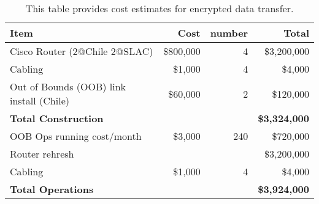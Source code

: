 \tiny \begin{longtable} {|l|r|r|r|} \caption{This table provides cost estimates for encrypted data transfer. \label{tab:ipsec}}\\ 
\hline 
\textbf{Item}&\textbf{Cost}&\textbf{number}&\textbf{Total} \\ \hline
{Cisco Router (2@Chile 2@SLAC)}&{\$800,000}&{4}&{\$3,200,000} \\ \hline
{Cabling}&{\$1,000}&{4}&{\$4,000} \\ \hline
{Out of Bounds (OOB) link  install (Chile)}&{\$60,000}&{2}&{\$120,000} \\ \hline
\textbf{Total Construction}&\textbf{}&\textbf{}&\textbf{\$3,324,000} \\ \hline
{OOB Ops running cost/month}&{\$3,000}&{240}&{\$720,000} \\ \hline
{Router rehresh}&{}&{ }&{\$3,200,000} \\ \hline
{Cabling}&{\$1,000}&{4}&{\$4,000} \\ \hline
\textbf{Total Operations}&\textbf{}&\textbf{}&\textbf{\$3,924,000} \\ \hline
\end{longtable} \normalsize
